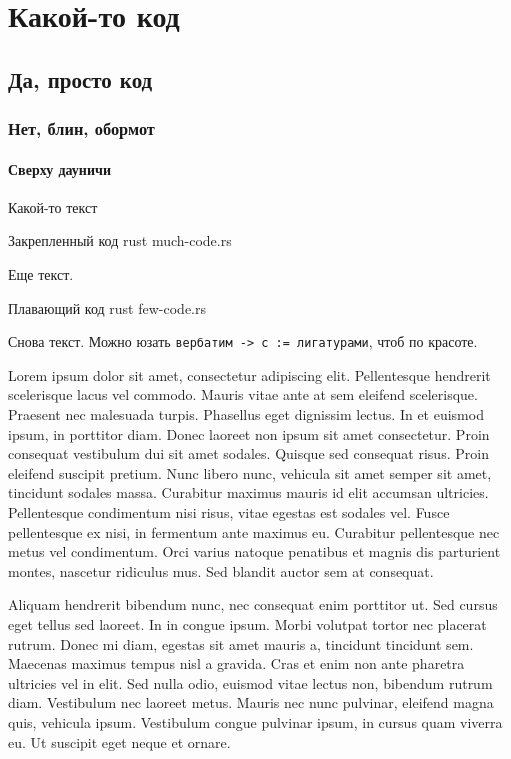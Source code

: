 \chapter{Какой-то код}
\section{Да, просто код}
\subsection{Нет, блин, обормот}
\subsubsection{Сверху дауничи}

Какой-то текст

\fixedlisting
    {Закрепленный код}
    {rust}
    {much-code.rs}

Еще текст.

\floatinglisting
    {Плавающий код}
    {rust}
    {few-code.rs}

Снова текст. Можно юзать \verb+вербатим -> с := лигатурами+, чтоб по красоте.

Lorem ipsum dolor sit amet, consectetur adipiscing elit. Pellentesque hendrerit scelerisque lacus vel commodo. Mauris vitae ante at sem eleifend scelerisque. Praesent nec malesuada turpis. Phasellus eget dignissim lectus. In et euismod ipsum, in porttitor diam. Donec laoreet non ipsum sit amet consectetur. Proin consequat vestibulum dui sit amet sodales. Quisque sed consequat risus. Proin eleifend suscipit pretium. Nunc libero nunc, vehicula sit amet semper sit amet, tincidunt sodales massa. Curabitur maximus mauris id elit accumsan ultricies. Pellentesque condimentum nisi risus, vitae egestas est sodales vel. Fusce pellentesque ex nisi, in fermentum ante maximus eu. Curabitur pellentesque nec metus vel condimentum. Orci varius natoque penatibus et magnis dis parturient montes, nascetur ridiculus mus. Sed blandit auctor sem at consequat.

Aliquam hendrerit bibendum nunc, nec consequat enim porttitor ut. Sed cursus eget tellus sed laoreet. In in congue ipsum. Morbi volutpat tortor nec placerat rutrum. Donec mi diam, egestas sit amet mauris a, tincidunt tincidunt sem. Maecenas maximus tempus nisl a gravida. Cras et enim non ante pharetra ultricies vel in elit. Sed nulla odio, euismod vitae lectus non, bibendum rutrum diam. Vestibulum nec laoreet metus. Mauris nec nunc pulvinar, eleifend magna quis, vehicula ipsum. Vestibulum congue pulvinar ipsum, in cursus quam viverra eu. Ut suscipit eget neque et ornare.

